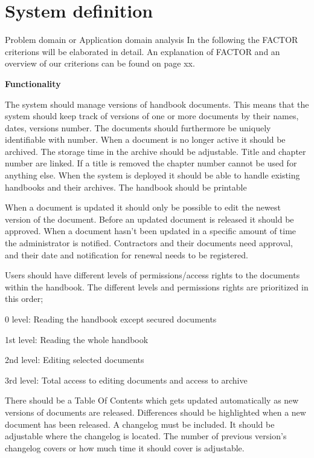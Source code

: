 \section{System definition}

Problem domain or Application domain analysis
In the following the FACTOR criterions will be elaborated in detail. An explanation of FACTOR and an overview of our criterions can be found on page xx.

\textbf{Functionality}

The system should manage versions of handbook documents. This means that the system should keep track of versions of one or more documents by their names, dates, versions number. The documents should furthermore be uniquely identifiable with number. When a document is no longer active it should be archived. The storage time in the archive should be adjustable. Title and chapter number are linked. If a title is removed the chapter number cannot be used for anything else. When the system is deployed it should be able to handle existing handbooks and their archives. The handbook should be printable

When a document is updated it should only be possible to edit the newest version of the document. Before an updated document is released it should be approved. When a document hasn’t been updated in a specific amount of time the administrator is notified. Contractors and their documents need approval, and their date and notification for renewal needs to be registered. %

Users should have different levels of permissions/access rights to the documents within the handbook. The different levels and permissions rights are prioritized in this order;

0 level: Reading the handbook except secured documents

1st level: Reading the whole handbook

2nd level: Editing selected documents

3rd level: Total access to editing documents and access to archive

There should be a Table Of Contents which gets updated automatically as new versions of documents are released. Differences should be highlighted when a new document has been released. A changelog must be included. It should be adjustable where the changelog is located. The number of previous version’s changelog covers or how much time it should cover is adjustable.

